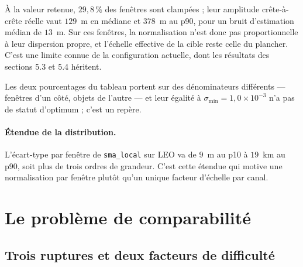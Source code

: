 \documentclass{article}
\begin{document}
À la valeur retenue, $29{,}8\,\%$ des fenêtres sont clampées ; leur amplitude crête-à-crête réelle vaut $129$~m en médiane et $378$~m au p90, pour un bruit d'estimation médian de $13$~m. Sur ces fenêtres, la normalisation n'est donc pas proportionnelle à leur dispersion propre, et l'échelle effective de la cible reste celle du plancher. C'est une limite connue de la configuration actuelle, dont les résultats des sections 5.3 et 5.4 héritent.

Les deux pourcentages du tableau portent sur des dénominateurs différents --- fenêtres d'un côté, objets de l'autre --- et leur égalité à $\sigma_{\min} = 1{,}0\times10^{-3}$ n'a pas de statut d'optimum ; c'est un repère.

\paragraph{Étendue de la distribution.} L'écart-type par fenêtre de \texttt{sma\_local} sur LEO va de $9$~m au p10 à $19$~km au p90, soit plus de trois ordres de grandeur. C'est cette étendue qui motive une normalisation par fenêtre plutôt qu'un unique facteur d'échelle par canal.

\section{Le problème de comparabilité}

\subsection{Trois ruptures et deux facteurs de difficulté}

\vspace{0.3cm}
\noindent{}
\vspace{0.3cm}
\end{document}
